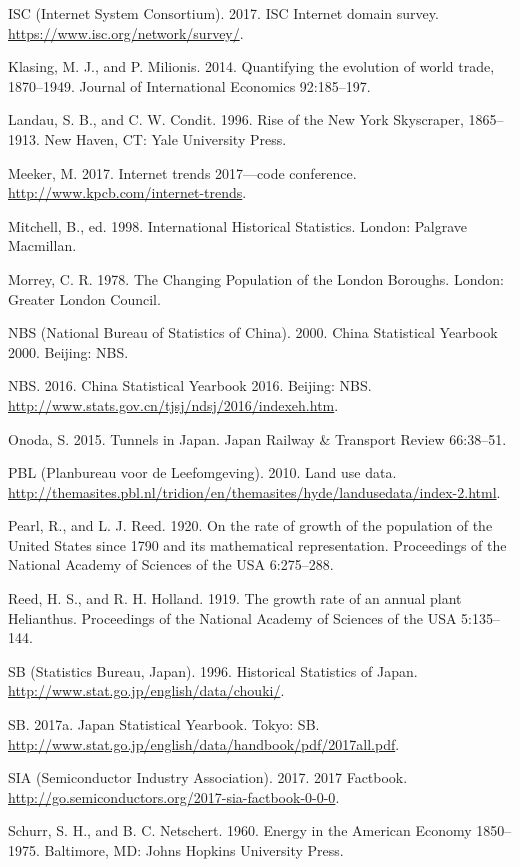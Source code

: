 \documentclass[aps,rmp,preprint,superscriptaddress,10pt,onecolumn]{article}
\begin{document}
ISC (Internet System Consortium). 2017. ISC Internet domain survey. \url{https://www.isc.org/network/survey/}.\par
Klasing, M. J., and P. Milionis. 2014. Quantifying the evolution of world trade, 1870–1949. Journal of International Economics 92:185–197.\par
Landau, S. B., and C. W. Condit. 1996. Rise of the New York Skyscraper, 1865–1913. New Haven, CT: Yale University Press.\par
Meeker, M. 2017. Internet trends 2017—code conference. \url{http://www.kpcb.com/internet-trends}.\par
Mitchell, B., ed. 1998. International Historical Statistics. London: Palgrave Macmillan.\par
Morrey, C. R. 1978. The Changing Population of the London Boroughs. London: Greater London Council.\par
NBS (National Bureau of Statistics of China). 2000. China Statistical Yearbook 2000. Beijing: NBS.\par
NBS. 2016. China Statistical Yearbook 2016. Beijing: NBS. \url{http://www.stats.gov.cn/tjsj/ndsj/2016/indexeh.htm}.\par
Onoda, S. 2015. Tunnels in Japan. Japan Railway \& Transport Review 66:38–51.\par
PBL (Planbureau voor de Leefomgeving). 2010. Land use data. \url{http://themasites.pbl.nl/tridion/en/themasites/hyde/landusedata/index-2.html}.\par
Pearl, R., and L. J. Reed. 1920. On the rate of growth of the population of the United States since 1790 and its mathematical representation. Proceedings of the National Academy of Sciences of the USA 6:275–288.\par
Reed, H. S., and R. H. Holland. 1919. The growth rate of an annual plant Helianthus. Proceedings of the National Academy of Sciences of the USA 5:135–144.\par
SB (Statistics Bureau, Japan). 1996. Historical Statistics of Japan. \url{http://www.stat.go.jp/english/data/chouki/}.\par
SB. 2017a. Japan Statistical Yearbook. Tokyo: SB. \url{http://www.stat.go.jp/english/data/handbook/pdf/2017all.pdf}.\par
SIA (Semiconductor Industry Association). 2017. 2017 Factbook. \url{http://go.semiconductors.org/2017-sia-factbook-0-0-0}.\par
Schurr, S. H., and B. C. Netschert. 1960. Energy in the American Economy 1850–1975. Baltimore, MD: Johns Hopkins University Press.\par
\end{document}
